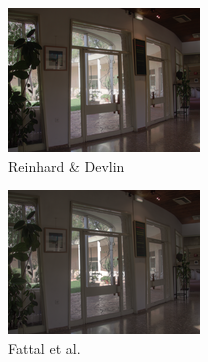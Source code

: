 \begin{figure}
\begin{subfigure}[b]{0.33\textwidth}
    \includegraphics[width=\textwidth]{figures/chapter2/tmos44/44_reinhard05.png}
    \caption{Reinhard \& Devlin~\cite{reinhard2005dynamic}}
\end{subfigure}\hfill
\begin{subfigure}[b]{0.33\textwidth}
    \centering
    \includegraphics[width=\textwidth]{figures/chapter2/tmos44/44_fattal02.png}
    \caption{Fattal et al.~\cite{durand2002fast}}
\end{subfigure}\hfill
\begin{subfigure}[b]{0.33\textwidth}
    \centering

\end{subfigure}
\end{figure}
